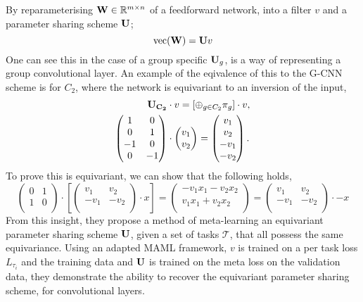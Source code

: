By reparameterising $\mathbf{W} \in \mathbb{R}^{m \times n}$ of a feedforward network, into a filter $v$ and a parameter sharing scheme $\mathbf{U}$;
\begin{equation}
	\text{vec}(\mathbf{W}) = \mathbf{U}v
\end{equation}
One can see this in the case of a group specific $\mathbf{U}_g$, is a way of representing a group convolutional layer.
An example of the eqivalence of this to the G-CNN scheme is for $C_2$, where the network is equivariant to an inversion of the input,
\begin{align}
	\mathbf{U_{C_2}}   & \cdot v  = [\oplus_{g \in C_2} \pi_g] \cdot v, \\
	\begin{pmatrix}
		1  & 0  \\
		0  & 1  \\
		-1 & 0  \\
		0  & -1 \\
	\end{pmatrix} & \cdot
	\begin{pmatrix}
		v_1 \\
		v_2 \\
	\end{pmatrix}
	= \begin{pmatrix}
		  v_1  \\
		  v_2  \\
		  -v_1 \\
		  -v_2 \\
	  \end{pmatrix}.
\end{align}
To prove this is equivariant, we can show that the following holds,
\begin{equation}
	\begin{pmatrix}
		0 & 1 \\
		1 & 0 \\
	\end{pmatrix} \cdot \left[
		\begin{pmatrix}
			v_1  & v_2  \\
			-v_1 & -v_2 \\
		\end{pmatrix} \cdot x \right] = \begin{pmatrix}
		-v_1 x_1 - v_2 x_2 \\
		v_1 x_1 + v_2 x_2  \\
	\end{pmatrix}
	= \begin{pmatrix}
		v_1  & v_2  \\
		-v_1 & -v_2 \\
	\end{pmatrix} \cdot  -x
\end{equation}
From this insight, they propose a method of meta-learning an equivariant parameter sharing scheme $\mathbf{U}$, given a set of tasks $\mathcal{T}$, that all possess the same equivariance.
Using an adapted MAML framework, $v$ is trained on a per task loss $L_{\tau_i}$ and the training data and $\mathbf{U}$ is trained on the meta loss on the validation data, they demonstrate the ability to recover the equivariant parameter sharing scheme, for convolutional layers.


